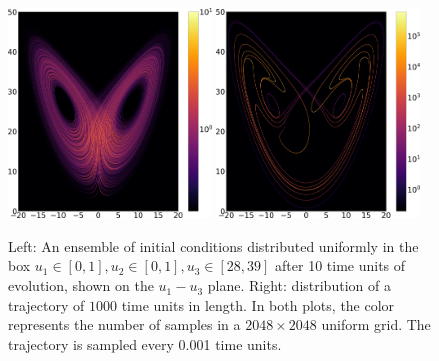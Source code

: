 \documentclass[preprint,12pt]{elsarticle}
\begin{document}
\begin{figure} \centering
\includegraphics[width=0.48\textwidth]{lorenz_trajectory_1000.0.png}
\hspace{0.02\textwidth}
\includegraphics[width=0.48\textwidth]{lorenz_ensemble_10.png}
\caption{
Left: An ensemble of initial conditions distributed uniformly in the box $u_1\in[0,1], u_2\in[0,1], u_3\in[28,39]$ 
after 10 time units of evolution, shown on the $u_1-u_3$ plane.
Right: distribution of a trajectory of $1000$ time units in length.
In both plots, the color represents the number of samples in a
$2048\times2048$ uniform grid.  The trajectory is sampled every 0.001 time units.
}
\label{fig:lorenz_ergodicity1}
\end{figure}
\end{document}
